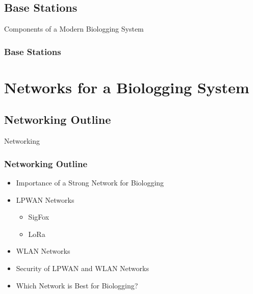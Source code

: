 \documentclass{beamer}
\begin{document}
\subsection{Base Stations}
  \begin{frame}{Components of a Modern Biologging System}
    \frametitle{Base Stations}
  \end{frame}




\section{Networks for a Biologging System}

\subsection{Networking Outline}
  \begin{frame}{Networking}
    \frametitle{Networking Outline}
    \begin{itemize}
      \item Importance of a Strong Network for Biologging
      \item LPWAN Networks
      \begin{itemize}
        \item SigFox
        \item LoRa
      \end{itemize}
      \item WLAN Networks
      \item Security of LPWAN and WLAN Networks
      \item Which Network is Best for Biologging?
    \end{itemize}
  \end{frame}
\end{document}
